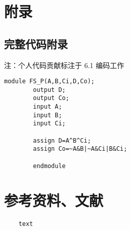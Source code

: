
\section{附录}

\subsection{完整代码附录}
注：个人代码贡献标注于 6.1 编码工作
  \begin{lstlisting}[style=verilog, title=\texttt{示例}, basicstyle=\zihao{-4}\ttfamily]
		module FS_P(A,B,Ci,D,Co);
		output D;
		output Co;
		input A;
		input B;
		input Ci;
	
		assign D=A^B^Ci;
		assign Co=~A&B|~A&Ci|B&Ci;

		endmodule	
	\end{lstlisting}
\section{参考资料、文献}
\begin{lstlisting}
    text
\end{lstlisting}
